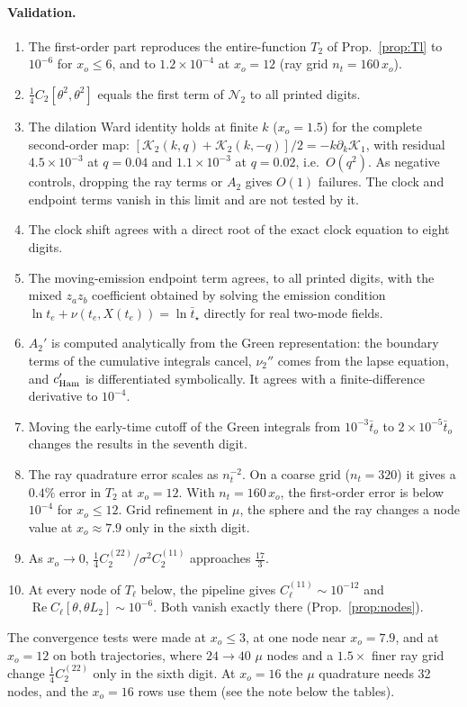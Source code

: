 \paragraph{Validation.}
\begin{enumerate}
\item The first-order part reproduces the entire-function $T_2$ of Prop.~\ref{prop:Tl} to
  $10^{-6}$ for $x_o\le6$, and to $1.2\times10^{-4}$ at $x_o=12$ (ray grid $n_t=160\,x_o$).
\item $\frac14C_2[\theta^2,\theta^2]$ equals the first term of $\mathcal N_2$ to all printed
  digits.
\item The dilation Ward identity holds at finite $k$ ($x_o=1.5$) for the complete second-order
  map: $[\mathcal K_2(k,q)+\mathcal K_2(k,-q)]/2=-k\partial_k\mathcal K_1$, with residual
  $4.5\times10^{-3}$ at $q=0.04$ and $1.1\times10^{-3}$ at $q=0.02$, i.e.\ $O(q^2)$. As negative
  controls, dropping the ray terms or $A_2$ gives $O(1)$ failures. The clock and endpoint
  terms vanish in this limit and are not tested by it.
\item The clock shift agrees with a direct root of the exact clock equation to eight digits.
\item The moving-emission endpoint term agrees, to all printed digits, with the mixed
  $z_az_b$ coefficient obtained by solving the emission condition
  $\ln t_e+\nu(t_e,X(t_e))=\ln\bar t_\star$ directly for real two-mode fields.
\item $A_2'$ is computed analytically from the Green representation: the boundary terms of
  the cumulative integrals cancel, $\nu_2''$ comes from the lapse equation, and
  $c_{\rm Ham}'$ is differentiated symbolically. It agrees with a finite-difference
  derivative to $10^{-4}$.
\item Moving the early-time cutoff of the Green integrals from $10^{-3}\bar t_o$ to
  $2\times10^{-5}\bar t_o$ changes the results in the seventh digit.
\item The ray quadrature error scales as $n_t^{-2}$. On a coarse grid
  ($n_t=320$) it gives a $0.4\%$ error in $T_2$ at $x_o=12$. With $n_t=160\,x_o$, the first-order error is below
  $10^{-4}$ for $x_o\le12$. Grid refinement in $\mu$, the sphere and the ray changes a node
  value at $x_o\approx7.9$ only in the sixth digit.
\item As $x_o\to0$, $\frac14C_2^{(22)}/\sigma^2C_2^{(11)}$ approaches $\frac{17}3$.
\item At every node of $T_\ell$ below, the pipeline gives $C^{(11)}_\ell\sim10^{-12}$ and
  $\operatorname{Re}C_\ell[\theta,\theta L_2]\sim10^{-6}$. Both vanish exactly there
  (Prop.~\ref{prop:nodes}).
\end{enumerate}
The convergence tests were made at $x_o\le3$, at one node near $x_o=7.9$, and at $x_o=12$ on
both trajectories, where $24\to40$ $\mu$ nodes and a $1.5\times$ finer ray grid change
$\frac14C^{(22)}_2$ only in the sixth digit. At $x_o=16$ the $\mu$ quadrature needs 32 nodes, and
the $x_o=16$ rows use them (see the note below the tables).


